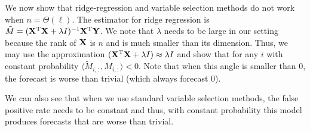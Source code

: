  We now show that ridge-regression and variable selection methods do not work when $n = \Theta(\ell)$. The estimator for ridge regression is $\tilde M = (\mathbf{X}^{\mathrm{T}}\mathbf{X} + \lambda I)^{-1}\mathbf{X}^{\mathrm{T}}\mathbf{Y}$. We note that $\lambda$ needs to be large in our setting because the rank of $\mathbf{X}$ is $n$ and is much smaller than its dimension. Thus, we may use the approximation $(\mathbf{X}^{\mathrm{T}}\mathbf{X} + \lambda I) \approx \lambda I$ and show that for any $i$ with constant probability $\langle \tilde M_{i, :}, M_{i, :}\rangle < 0$. Note that when this angle is smaller than $0$, the forecast is worse than trivial (which always forecast 0). 

We can also see that when we use standard variable selection methods, the false positive rate needs to be constant and thus, with constant probability this model produces forecasts that are worse than trivial. 
